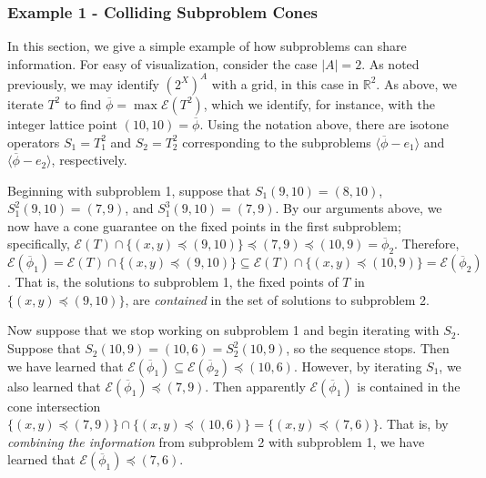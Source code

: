 \documentclass[11pt,reqno]{amsart}
\theoremstyle{definition}
\numberwithin{equation}{section}
\newcommand{\mr}{\mathbb{R}}
\newcommand{\ol}{\overline}
\newcommand{\lag}{\langle}
\newcommand{\rag}{\rangle}
\newcommand{\pre}{\phi}
\newcommand{\prealloc}{(2^X)^A}
\newcommand{\sub}{\subseteq}
\newcommand{\fix}{\mathcal{E}}
\newcommand{\peq}{\preceq}
\newcommand{\toppre}{\ol{\pre}}
\begin{document}
\subsubsection{Example 1 - Colliding Subproblem Cones}
In this section, we give a simple example of how subproblems can share information.
For easy of visualization, consider the case $|A| = 2$. As noted previously, we may identify $\prealloc$ with a grid, in this case in $\mr^2$.
As above, we iterate $T^2$ to find $\toppre = \max \fix(T^2)$, which we identify, for instance, with the integer lattice point $(10,10) = \toppre$. 
Using the notation above, there are isotone operators $S_1 = T_1^2$ and $S_2 = T_2^2$ corresponding to the subproblems $\lag \toppre - e_1 \rag$ and $\lag \toppre - e_2 \rag$, respectively. 

Beginning with subproblem 1, suppose that $S_1 (9,10) = (8,10)$, $S_1^2 (9,10) = (7,9)$, and $S_1^3 (9,10) = (7,9)$.
By our arguments above, we now have a cone guarantee on the fixed points in the first subproblem; specifically, $\fix(T) \cap \{(x,y) \peq (9,10)\} \peq (7,9) \peq (10,9) = \toppre_2$.
Therefore, $\fix(\toppre_1) = \fix(T) \cap \{(x,y) \peq (9,10)\} \sub \fix(T) \cap \{(x,y) \peq (10,9)\} = \fix(\toppre_2)$. 
That is, the solutions to subproblem 1, the fixed points of $T$ in $\{(x,y) \peq (9,10)\}$, are \emph{contained} in the set of solutions to subproblem 2. 

Now suppose that we stop working on subproblem 1 and begin iterating with $S_2$.
Suppose that $S_2(10,9) = (10,6) = S_2^2(10,9)$, so the sequence stops.
Then we have learned that $\fix(\toppre_1) \sub \fix(\toppre_2) \peq (10,6)$. 
However, by iterating $S_1$, we also learned that $\fix(\toppre_1) \peq (7,9)$. 
Then apparently $\fix(\toppre_1)$ is contained in the cone intersection $\{(x,y) \peq (7,9)\} \cap \{(x,y) \peq (10, 6)\} = \{(x,y) \peq (7,6) \}$. 
That is, by \emph{combining the information} from subproblem 2 with subproblem 1, we have learned that $\fix(\toppre_1) \peq (7,6)$. 
\end{document}
